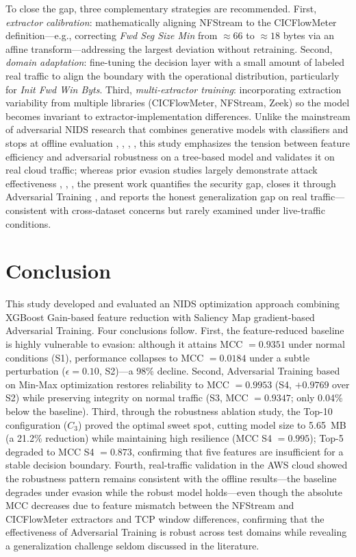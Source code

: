 \documentclass{iaesarticle}
\begin{document}
To close the gap, three complementary strategies are recommended. First, \textit{extractor calibration}: mathematically aligning NFStream to the CICFlowMeter definition---e.g., correcting \textit{Fwd Seg Size Min} from $\approx66$ to $\approx18$ bytes via an affine transform---addressing the largest deviation without retraining. Second, \textit{domain adaptation}: fine-tuning the decision layer with a small amount of labeled real traffic to align the boundary with the operational distribution, particularly for \textit{Init Fwd Win Byts}. Third, \textit{multi-extractor training}: incorporating extraction variability from multiple libraries (CICFlowMeter, NFStream, Zeek) so the model becomes invariant to extractor-implementation differences. Unlike the mainstream of adversarial NIDS research that combines generative models with classifiers and stops at offline evaluation \cite{17}, \cite{18}, \cite{27}, \cite{26}, this study emphasizes the tension between feature efficiency and adversarial robustness on a tree-based model and validates it on real cloud traffic; whereas prior evasion studies largely demonstrate attack effectiveness \cite{29}, \cite{31}, \cite{33}, the present work quantifies the security gap, closes it through Adversarial Training \cite{52}, and reports the honest generalization gap on real traffic---consistent with cross-dataset concerns \cite{43} but rarely examined under live-traffic conditions.

\section{Conclusion}
This study developed and evaluated an NIDS optimization approach combining XGBoost Gain-based feature reduction with Saliency Map gradient-based Adversarial Training. Four conclusions follow. First, the feature-reduced baseline is highly vulnerable to evasion: although it attains MCC $=0.9351$ under normal conditions (S1), performance collapses to MCC $=0.0184$ under a subtle perturbation ($\epsilon=0.10$, S2)---a 98\% decline. Second, Adversarial Training based on Min-Max optimization restores reliability to MCC $=0.9953$ (S4, $+0.9769$ over S2) while preserving integrity on normal traffic (S3, MCC $=0.9347$; only 0.04\% below the baseline). Third, through the robustness ablation study, the Top-10 configuration ($C_3$) proved the optimal sweet spot, cutting model size to 5.65~MB (a 21.2\% reduction) while maintaining high resilience (MCC S4 $=0.995$); Top-5 degraded to MCC S4 $=0.873$, confirming that five features are insufficient for a stable decision boundary. Fourth, real-traffic validation in the AWS cloud showed the robustness pattern remains consistent with the offline results---the baseline degrades under evasion while the robust model holds---even though the absolute MCC decreases due to feature mismatch between the NFStream and CICFlowMeter extractors and TCP window differences, confirming that the effectiveness of Adversarial Training is robust across test domains while revealing a generalization challenge seldom discussed in the literature.
\end{document}
